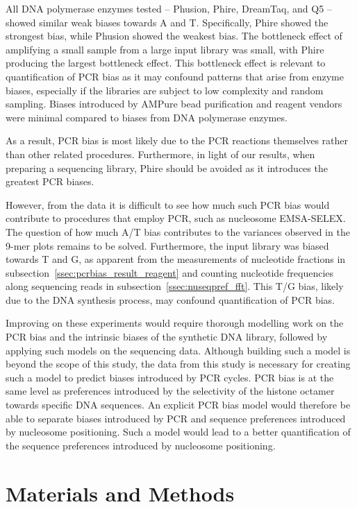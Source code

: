 \documentclass[a4paper, numbers=noenddot]{scrbook}
\begin{document}
All DNA polymerase enzymes tested -- Phusion, Phire, DreamTaq, and Q5  -- showed similar weak biases towards A and T.  Specifically, Phire showed the strongest bias, while Phusion showed the weakest bias.  The bottleneck effect of amplifying a small sample from a large input library was small, with Phire producing the largest bottleneck effect.  This bottleneck effect is relevant to quantification of PCR bias as it may confound patterns that arise from enzyme biases, especially if the libraries are subject to low complexity and random sampling.  Biases introduced by AMPure bead purification and reagent vendors were minimal compared to biases from DNA polymerase enzymes.

As a result, PCR bias is most likely due to the PCR reactions themselves rather than other related procedures.  Furthermore, in light of our results, when preparing a sequencing library, Phire should be avoided as it introduces the greatest PCR biases.

However, from the data it is difficult to see how much such PCR bias would contribute to procedures that employ PCR, such as nucleosome EMSA-SELEX.  The question of how much A/T bias contributes to the variances observed in the 9-mer plots remains to be solved.  Furthermore, the input library was biased towards T and G, as apparent from the measurements of nucleotide fractions in subsection~\ref{ssec:pcrbias_result_reagent} and counting nucleotide frequencies along sequencing reads in subsection~\ref{ssec:nuseqpref_fft}.  This T/G bias, likely due to the DNA synthesis process, may confound quantification of PCR bias.

Improving on these experiments would require thorough modelling work on the PCR bias and the intrinsic biases of the synthetic DNA library, followed by applying such models on the sequencing data.  Although building such a model is beyond the scope of this study, the data from this study is necessary for creating such a model to predict biases introduced by PCR cycles.  PCR bias is at the same level as preferences introduced by the selectivity of the histone octamer towards specific DNA sequences.  An explicit PCR bias model would therefore be able to separate biases introduced by PCR and sequence preferences introduced by nucleosome positioning.  Such a model would lead to a better quantification of the sequence preferences introduced by nucleosome positioning.

\section{Materials and Methods}
\label{sec:pcrbias_methods}
\end{document}
